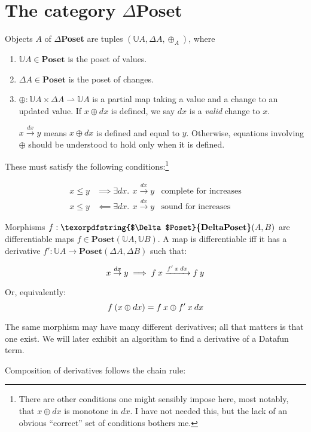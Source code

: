 \documentclass{rntz}\usepackage[a5]{rntzgeometry}\usepackage[fullwidth=13cm,width=315pt]{narrow}
\newcommand\mathvar[1]{\ensuremath{#1}} %
\newcommand\<{\mskip 4mu plus 4mu minus 1mu}
\newcommand\dx{\mathvar{dx}}
\newcommand\cat\textbf
\newcommand\CP{\cat{\texorpdfstring{$\Delta$Poset}{DeltaPoset}}}
\newcommand\Poset{\cat{Poset}}
\newcommand\D\Delta
\newcommand\x\times
\newcommand\pto\rightharpoonup
\newcommand\valfn{\ensuremath{\mathbb{U}}}
\newcommand\vals{\valfn}
\newcommand\chgs[1]{\D{#1}}
\newcommand\deriv[1]{\ensuremath{#1'}}
\newcommand\upd{\mathbin{\oplus}}
\newcommand\updfn{\ensuremath{{\upd}}}
\newcommand\bindsp{~\,}
\newcommand\ex[1]{\exists #1.\bindsp}
\newcommand\validarrow\to
\newcommand\valid[1]{\mathrel{\overset{#1}{\validarrow}}}
\newcommand\longvalid[1]{\mathrel{\xrightarrow{#1}}}
\newcommand\vld[3]{{#2 \valid{#1} #3}}
\newcommand\longvld[3]{{#2 \longvalid{#1} #3}}
\begin{document}

\section{The category \CP}

Objects $A$ of \CP{} are tuples $(\vals A, \chgs A, \updfn_A)$, where
%
\begin{enumerate}
\item $\vals A \in \Poset$ is the poset of values.

\item $\chgs A \in \Poset$ is the poset of changes.

\item $\updfn : \vals A \x \chgs A \pto \vals A$ is a partial map taking a value
  and a change to an updated value. If $x \upd \dx$ is defined, we say $\dx$ is a
  \emph{valid} change to $x$.

  $\vld{\dx} x y$ means $x \upd \dx$ is defined and equal to $y$. Otherwise,
  equations involving \updfn{} should be understood to hold only when it is
  defined.
\end{enumerate}

\noindent
These must satisfy the following conditions:\footnote{There are other conditions
  one might sensibly impose here, most notably, that $x \upd \dx$ is monotone in
  $\dx$. I have not needed this, but the lack of an obvious ``correct'' set of
  conditions bothers me.}

\begin{align*}
  x \le y &\implies \ex{\dx} \vld{\dx} x y
  & \text{complete for increases}\\
  x \le y &\impliedby \ex{\dx} \vld{\dx} x y
  & \text{sound for increases}
\end{align*}

\noindent
Morphisms $f : \CP(A,B)$ are differentiable maps $f \in \Poset(\vals A, \vals
B)$. A map is differentiable iff it has a derivative $\deriv f : \vals A
\to \Poset(\chgs A, \chgs B)$ such that:

\[ \vld{\dx} x y \implies \longvld{\deriv f\<x\<\dx}{f\<x}{f\<y}\]

\noindent Or, equivalently:
\[ f\<(x \upd \dx) = f\<x \upd \deriv f\<x\<\dx \]

\noindent
The same morphism may have many different derivatives; all that matters is that
one exist. We will later exhibit an algorithm to find a derivative of a Datafun
term.

Composition of derivatives follows the chain rule:
\end{document}
